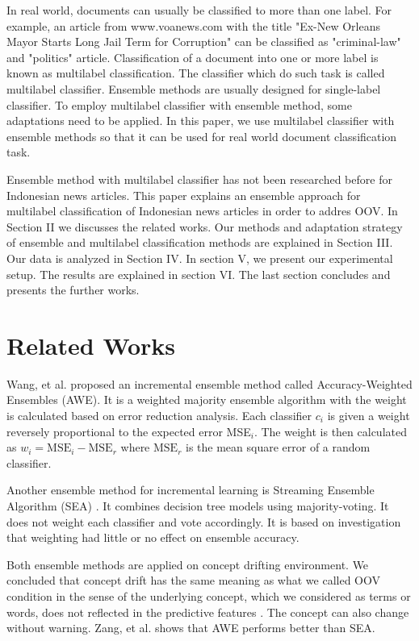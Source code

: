 \documentclass[conference]{IEEEtran}
\begin{document}
In real world, documents can usually be classified to more than one label.
For example, an article from www.voanews.com with the title "Ex-New Orleans Mayor Starts Long Jail Term for Corruption" can be classified as "criminal-law" and "politics" article.
Classification of a document into one or more label is known as multilabel classification.
The classifier which do such task is called multilabel classifier.
Ensemble methods are usually designed for single-label classifier.
To employ multilabel classifier with ensemble method, some adaptations need to be applied.
In this paper, we use multilabel classifier with ensemble methods so that it can be used for real world document classification task.

Ensemble method with multilabel classifier has not been researched before for Indonesian news articles.
This paper explains an ensemble approach for multilabel classification of Indonesian news articles in order to addres OOV.
In Section II we discusses the related works.
Our methods and adaptation strategy of ensemble and multilabel classification methods are explained in Section III.
Our data is analyzed in Section IV.
In section V, we present our experimental setup.
The results are explained in section VI.
The last section concludes and presents the further works.

\section{Related Works}

Wang, et al. \cite{wang} proposed an incremental ensemble method called Accuracy-Weighted Ensembles (AWE).
It is a weighted majority ensemble algorithm with the weight is calculated based on error reduction analysis.
Each classifier $c_i$ is given a weight reversely proportional to the expected error MSE$_i$.
The weight is then calculated as $w_i = \text{MSE}_i - \text{MSE}_r$ where $\text{MSE}_r$ is the mean square error of a random classifier.

Another ensemble method for incremental learning is Streaming Ensemble Algorithm (SEA) \cite{street}.
It combines decision tree models using majority-voting.
It does not weight each classifier and vote accordingly.
It is based on investigation that weighting had little or no effect on ensemble accuracy.

Both ensemble methods are applied on concept drifting environment.
We concluded that concept drift has the same meaning as what we called OOV condition in the sense of the underlying concept, which we considered as terms or words, does not reflected in the predictive features \cite{street}.
The concept can also change without warning.
Zang, et al. \cite{zang} shows that AWE performs better than SEA.
\end{document}
